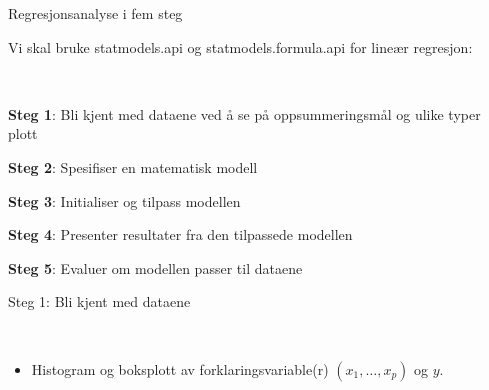 \documentclass[10pt,ignorenonframetext,]{beamer}
\providecommand{\tightlist}{%
  \setlength{\itemsep}{0pt}\setlength{\parskip}{0pt}}
\begin{document}
\begin{frame}{Regresjonsanalyse i fem steg}
\protect\hypertarget{regresjonsanalyse-i-fem-steg}{}

Vi skal bruke statmodels.api og statmodels.formula.api for lineær
regresjon:

\(~\)

\textbf{Steg 1}: Bli kjent med dataene ved å se på oppsummeringsmål og
ulike typer plott

\textbf{Steg 2}: Spesifiser en matematisk modell

\textbf{Steg 3}: Initialiser og tilpass modellen

\textbf{Steg 4}: Presenter resultater fra den tilpassede modellen

\textbf{Steg 5}: Evaluer om modellen passer til dataene

\end{frame}

\begin{frame}

\begin{block}{Steg 1: Bli kjent med dataene}

\(~\)

\begin{itemize}
\tightlist
\item
  Histogram og boksplott av forklaringsvariable(r) \((x_1,\ldots, x_p)\)
  og \(y\).
\end{itemize}

\end{block}

\end{frame}
\end{document}

